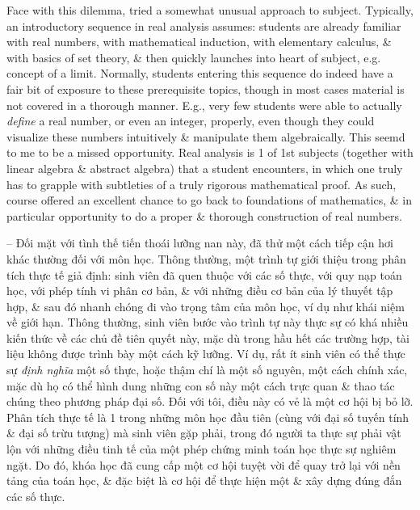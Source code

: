 \documentclass{article}
\begin{document}
\begin{itemize}
	Face with this dilemma, tried a somewhat unusual approach to subject. Typically, an introductory sequence in real analysis assumes: students are already familiar with real numbers, with mathematical induction, with elementary calculus, \& with basics of set theory, \& then quickly launches into heart of subject, e.g. concept of a limit. Normally, students entering this sequence do indeed have a fair bit of exposure to these prerequisite topics, though in most cases material is not covered in a thorough manner. E.g., very few students were able to actually {\it define} a real number, or even an integer, properly, even though they could visualize these numbers intuitively \& manipulate them algebraically. This seemd to me to be a missed opportunity. Real analysis is 1 of 1st subjects (together with linear algebra \& abstract algebra) that a student encounters, in which one truly has to grapple with subtleties of a truly rigorous mathematical proof. As such, course offered an excellent chance to go back to foundations of mathematics, \& in particular opportunity to do a proper \& thorough construction of real numbers.
	
	-- Đối mặt với tình thế tiến thoái lưỡng nan này, đã thử một cách tiếp cận hơi khác thường đối với môn học. Thông thường, một trình tự giới thiệu trong phân tích thực tế giả định: sinh viên đã quen thuộc với các số thực, với quy nạp toán học, với phép tính vi phân cơ bản, \& với những điều cơ bản của lý thuyết tập hợp, \& sau đó nhanh chóng đi vào trọng tâm của môn học, ví dụ như khái niệm về giới hạn. Thông thường, sinh viên bước vào trình tự này thực sự có khá nhiều kiến thức về các chủ đề tiên quyết này, mặc dù trong hầu hết các trường hợp, tài liệu không được trình bày một cách kỹ lưỡng. Ví dụ, rất ít sinh viên có thể thực sự {\it định nghĩa} một số thực, hoặc thậm chí là một số nguyên, một cách chính xác, mặc dù họ có thể hình dung những con số này một cách trực quan \& thao tác chúng theo phương pháp đại số. Đối với tôi, điều này có vẻ là một cơ hội bị bỏ lỡ. Phân tích thực tế là 1 trong những môn học đầu tiên (cùng với đại số tuyến tính \& đại số trừu tượng) mà sinh viên gặp phải, trong đó người ta thực sự phải vật lộn với những điều tinh tế của một phép chứng minh toán học thực sự nghiêm ngặt. Do đó, khóa học đã cung cấp một cơ hội tuyệt vời để quay trở lại với nền tảng của toán học, \& đặc biệt là cơ hội để thực hiện một \& xây dựng đúng đắn các số thực.
	

\end{itemize}
\end{document}
